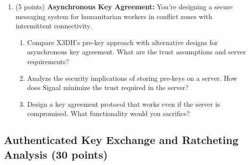 \documentclass[10pt,a4paper,american]{exam}
\begin{document}
\begin{enumerate}
	\item (5 points) \textbf{Asynchronous Key Agreement:}
	      You're designing a secure messaging system for humanitarian workers in conflict zones with intermittent connectivity.
	      \begin{enumerate}
		      \item Compare X3DH's pre-key approach with alternative designs for asynchronous key agreement. What are the trust assumptions and server requirements?
		      \item Analyze the security implications of storing pre-keys on a server. How does Signal minimize the trust required in the server?
		      \item Design a key agreement protocol that works even if the server is compromised. What functionality would you sacrifice?
	      \end{enumerate}
\end{enumerate}

\subsection{Authenticated Key Exchange and Ratcheting Analysis (30 points)}
\end{document}
